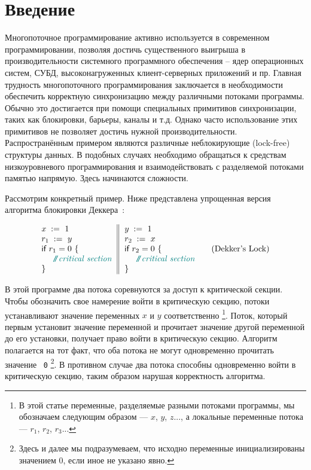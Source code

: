 \section{Введение}
\label{sec:intro}

Многопоточное программирование активно используется в современном программировании, позволяя достичь существенного выигрыша в производительности системного программного обеспечения – ядер операционных систем, СУБД, высоконагруженных клиент-серверных приложений и пр.  Главная трудность многопоточного программирования 
заключается в необходимости обеспечить 
корректную синхронизацию между различными потоками программы. 
Обычно это достигается при помощи специальных 
примитивов синхронизации, 
таких как блокировки, барьеры, каналы и т.д. 
Однако часто использование этих примитивов 
не позволяет достичь нужной производительности. 
Распространённым примером являются различные неблокирующие (lock-free) структуры данных.
В подобных случаях необходимо обращаться к средствам
низкоуровневого программирования и 
взаимодействовать с разделяемой потоками памятью напрямую.
Здесь начинаются сложности. 

Рассмотрим конкретный пример.
Ниже представлена упрощенная версия 
алгоритма блокировки Деккера~\cite{Dijkstra:68}:

\begin{equation*}
\inarrII{
\writeInst{}{x}{1} \\
\readInst{}{r_1}{y} \\
\kw{if} {r_1 = 0} ~\{ \\
~~ \comment{critical section} \\
\}
}{
\writeInst{}{y}{1} \\
\readInst{}{r_2}{x} \\
\kw{if} {r_2 = 0} ~\{ \\
~~ \comment{critical section} \\
\}
}
\tag{Dekker's Lock}\label{ex:Dekker}
\end{equation*}

В этой программе два потока соревнуются за доступ к критической секции.
Чтобы обозначить свое намерение войти в критическую секцию,
потоки устанавливают значение переменных $x$ и $y$ соответственно%
\footnote{В этой статье переменные, разделяемые разными потоками программы, мы обозначаем следующим образом ---
$x$, $y$, $z$..., а локальные переменные потока --- $r_1$, $r_2$, $r_3$...}.
Поток, который первым установит значение переменной и 
прочитает значение другой переменной до его установки,
получает право войти в критическую секцию.
Алгоритм полагается на тот факт, что оба 
потока не могут одновременно прочитать значение ~\texttt{0}%
\footnote{Здесь и далее мы подразумеваем, 
что исходно переменные инициализированы значением 0, если иное не указано явно.}.
В противном случае два потока способны одновременно 
войти в критическую секцию, таким образом нарушая корректность алгоритма. 

